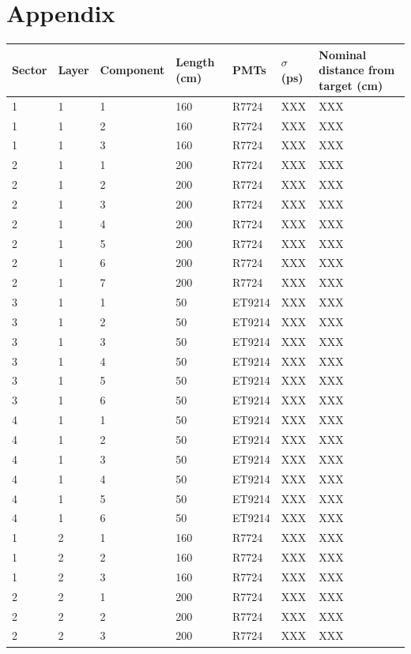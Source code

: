 \documentclass[3p,final,twocolumn]{elsarticle}
\begin{document}
\section{Appendix}
\begin{table}[ht]
\begin{tabular}{  m{3em} | m{3em} | m{5em} | m{3em} | m{3em} | m{3em} | m{8em} }
		\hline
			Sector & Layer & Component & Length (\si{\centi\meter}) & PMTs  & $\sigma$ (\si{\pico\second}) & Nominal distance from target (\si{\centi\meter}) \\
		\hline
		\hline
1	&1	&1	&160	&R7724	&XXX	&XXX\\ 
1	&1	&2	&160	&R7724	&XXX	&XXX\\ 
1	&1	&3	&160	&R7724	&XXX	&XXX\\ 
2	&1	&1	&200	&R7724	&XXX	&XXX\\ 
2	&1	&2	&200	&R7724	&XXX	&XXX\\ 
2	&1	&3	&200	&R7724	&XXX	&XXX\\ 
2	&1	&4	&200	&R7724	&XXX	&XXX\\ 
2	&1	&5	&200	&R7724	&XXX	&XXX\\ 
2	&1	&6	&200	&R7724	&XXX	&XXX\\ 
2	&1	&7	&200	&R7724	&XXX	&XXX\\ 
3	&1	&1	&50	&ET9214	&XXX	&XXX\\ 
3	&1	&2	&50	&ET9214	&XXX	&XXX\\ 
3	&1	&3	&50	&ET9214	&XXX	&XXX\\ 
3	&1	&4	&50	&ET9214	&XXX	&XXX\\ 
3	&1	&5	&50	&ET9214	&XXX	&XXX\\ 
3	&1	&6	&50	&ET9214	&XXX	&XXX\\ 
4	&1	&1	&50	&ET9214	&XXX	&XXX\\ 
4	&1	&2	&50	&ET9214	&XXX	&XXX\\ 
4	&1	&3	&50	&ET9214	&XXX	&XXX\\ 
4	&1	&4	&50	&ET9214	&XXX	&XXX\\ 
4	&1	&5	&50	&ET9214	&XXX	&XXX\\ 
4	&1	&6	&50	&ET9214	&XXX	&XXX\\ 
1	&2	&1	&160	&R7724	&XXX	&XXX\\ 
1	&2	&2	&160	&R7724	&XXX	&XXX\\ 
1	&2	&3	&160	&R7724	&XXX	&XXX\\ 
2	&2	&1	&200	&R7724	&XXX	&XXX\\ 
2	&2	&2	&200	&R7724	&XXX	&XXX\\ 
2	&2	&3	&200	&R7724	&XXX	&XXX\\ 

\end{tabular}
\end{table}
\end{document}
